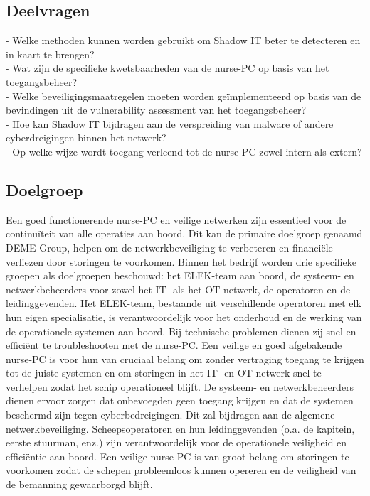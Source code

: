 \subsection{Deelvragen}   
- Welke methoden kunnen worden gebruikt om Shadow IT beter te detecteren en in kaart te brengen? \\
- Wat zijn de specifieke kwetsbaarheden van de nurse-PC op basis van het toegangsbeheer? \\       
- Welke beveiligingsmaatregelen moeten worden geïmplementeerd op basis van de bevindingen uit de vulnerability assessment van het toegangsbeheer? \\
- Hoe kan Shadow IT bijdragen aan de verspreiding van malware of andere cyberdreigingen binnen het netwerk?\\
- Op welke wijze wordt toegang verleend tot de nurse-PC zowel intern als extern? \\

\subsection{Doelgroep}
Een goed functionerende nurse-PC en veilige netwerken zijn essentieel voor de continuïteit van alle operaties aan boord. 
Dit kan de primaire doelgroep genaamd DEME-Group, helpen om de netwerkbeveiliging te verbeteren en financiële verliezen door storingen te voorkomen.
Binnen het bedrijf worden drie specifieke groepen als doelgroepen beschouwd: het ELEK-team aan boord, de systeem- en netwerkbeheerders voor zowel het IT- als het OT-netwerk, de operatoren en de leidinggevenden.
Het ELEK-team, bestaande uit verschillende operatoren met elk hun eigen specialisatie, is verantwoordelijk voor het onderhoud en de werking van de operationele systemen aan boord. Bij technische problemen dienen zij snel en efficiënt te troubleshooten met de nurse-PC.  
Een veilige en goed afgebakende nurse-PC is voor hun van cruciaal belang om zonder vertraging toegang te krijgen tot de juiste systemen en om storingen in het IT- en OT-netwerk snel te verhelpen zodat het schip operationeel blijft.
De systeem- en netwerkbeheerders dienen ervoor zorgen dat onbevoegden geen toegang krijgen en dat de systemen beschermd zijn tegen cyberbedreigingen. Dit zal bijdragen aan de algemene netwerkbeveiliging.
Scheepsoperatoren en hun leidinggevenden (o.a. de kapitein, eerste stuurman, enz.) zijn verantwoordelijk voor de operationele veiligheid en efficiëntie aan boord. Een veilige nurse-PC is van groot belang om storingen te voorkomen
zodat de schepen probleemloos kunnen opereren en de veiligheid van de bemanning gewaarborgd blijft.

